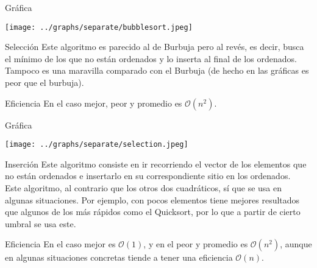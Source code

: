 \documentclass[compress]{beamer}
\begin{document}
\begin{frame}{Gráfica}
	\begin{alertblock}{}
		\begin{center}
		\texttt{[image: ../graphs/separate/bubblesort.jpeg]}
		\end{center}
	\end{alertblock}
\end{frame}

\begin{frame}{Selección}
Este algoritmo es parecido al de Burbuja pero al revés, es decir, busca el mínimo de los que no están ordenados y lo inserta al final de los ordenados.\\
\vspace{0.20in}
Tampoco es una maravilla comparado con el Burbuja (de hecho en las gráficas es peor que el burbuja).\\
\vspace{0.20in}
	\begin{block}{Eficiencia}
	En el caso mejor, peor y promedio es $\mathcal{O}(n^2)$.
	\end{block}
\end{frame}

\begin{frame}{Gráfica}
	\begin{alertblock}{}
		\begin{center}
		\texttt{[image: ../graphs/separate/selection.jpeg]}
		\end{center}
	\end{alertblock}
\end{frame}

\begin{frame}{Inserción}
Este algoritmo consiste en ir recorriendo el vector de los elementos que no están ordenados e insertarlo en su correspondiente sitio en los ordenados.\\
\vspace{0.20in}
Este algoritmo, al contrario que los otros dos cuadráticos, sí que se usa en algunas situaciones. Por ejemplo, con pocos elementos tiene mejores resultados que algunos de los más rápidos como el Quicksort, por lo que a partir de cierto umbral se usa este.\\
\vspace{0.20in}
	\begin{block}{Eficiencia}
	En el caso mejor es $\mathcal{O}(1)$, y en el peor y promedio es $\mathcal{O}(n^2)$, aunque en algunas situaciones concretas tiende a tener una eficiencia $\mathcal{O}(n)$.
	\end{block}
\end{frame}
\end{document}

